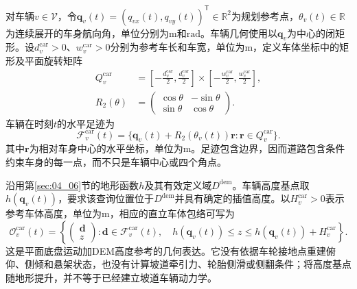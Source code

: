 对车辆$v\in\mathcal V$，令$\mathbf q_v(t)=(q_{vx}(t),q_{vy}(t))^{\mathsf T}\in\mathbb R^2$为规划参考点，$\theta_v(t)\in\mathbb R$为连续展开的车身航向角，单位分别为$\mathrm m$和$\mathrm{rad}$。车辆几何使用以$\mathbf q_v$为中心的闭矩形。设$d_v^{\mathrm{car}}>0$、$w_v^{\mathrm{car}}>0$分别为参考车长和车宽，单位为$\mathrm m$，定义车体坐标中的矩形及平面旋转矩阵
\begin{equation}
 \begin{split}
 Q_v^{\mathrm{car}}
 &=\left[-\frac{d_v^{\mathrm{car}}}{2},
           \frac{d_v^{\mathrm{car}}}{2}\right]
   \times
   \left[-\frac{w_v^{\mathrm{car}}}{2},
           \frac{w_v^{\mathrm{car}}}{2}\right],\\
 R_2(\theta)&=
 \begin{pmatrix}
 \cos\theta&-\sin\theta\\
 \sin\theta&\cos\theta
 \end{pmatrix}.
 \end{split}
 \label{s0407:body_rectangle}
\end{equation}
车辆在时刻$t$的水平足迹为
\begin{equation}
 \mathcal F_v^{\mathrm{car}}(t)
 =\{\mathbf q_v(t)+R_2(\theta_v(t))\mathbf r:
       \mathbf r\in Q_v^{\mathrm{car}}\}.
 \label{s0407:vehicle_footprint}
\end{equation}
其中$\mathbf r$为相对车身中心的水平坐标，单位为$\mathrm m$。足迹包含边界，因而道路包含条件约束车身的每一点，而不只是车辆中心或四个角点。

沿用第\ref{sec:04_06}节的地形函数$h$及其有效定义域$D^{\mathrm{dem}}$。车辆高度基点取$h(\mathbf q_v(t))$，要求该查询位置位于$D^{\mathrm{dem}}$并具有确定的插值高度。以$H_v^{\mathrm{car}}>0$表示参考车体高度，单位为$\mathrm m$，相应的直立车体包络可写为
\begin{equation}
 \mathcal O_v^{\mathrm{car}}(t)
 =\left\{
 \begin{pmatrix}\mathbf d\\z\end{pmatrix}:
 \mathbf d\in\mathcal F_v^{\mathrm{car}}(t),\quad
 h(\mathbf q_v(t))\le z\le
 h(\mathbf q_v(t))+H_v^{\mathrm{car}}
 \right\}.
 \label{s0407:vehicle_solid}
\end{equation}
这是平面底盘运动加DEM高度参考的几何表达。它没有依据车轮接地点重建俯仰、侧倾和悬架状态，也没有计算坡道牵引力、轮胎侧滑或侧翻条件；将高度基点随地形提升，并不等于已经建立坡道车辆动力学。

